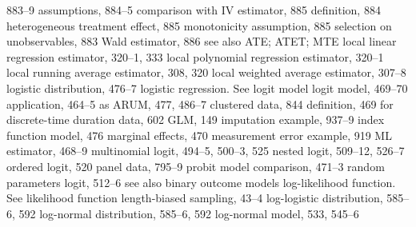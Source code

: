 883–9
assumptions, 884–5
comparison with IV estimator, 885 definition, 884
heterogeneous treatment effect, 885 monotonicity assumption, 885 selection on unobservables, 883 Wald estimator, 886
see also ATE; ATET; MTE
local linear regression estimator, 320–1, 333 local polynomial regression estimator, 320–1 local running average estimator, 308, 320 local weighted average estimator, 307–8 logistic distribution, 476–7
logistic regression. See logit model logit model, 469–70
application, 464–5
as ARUM, 477, 486–7
clustered data, 844
definition, 469
for discrete-time duration data, 602 GLM, 149
imputation example, 937–9
index function model, 476
marginal effects, 470
measurement error example, 919
ML estimator, 468–9
multinomial logit, 494–5, 500–3, 525 nested logit, 509–12, 526–7
ordered logit, 520
panel data, 795–9
probit model comparison, 471–3 random parameters logit, 512–6
see also binary outcome models
log-likelihood function. See likelihood function length-biased sampling, 43–4
log-logistic distribution, 585–6, 592 log-normal distribution, 585–6, 592 log-normal model, 533, 545–6

